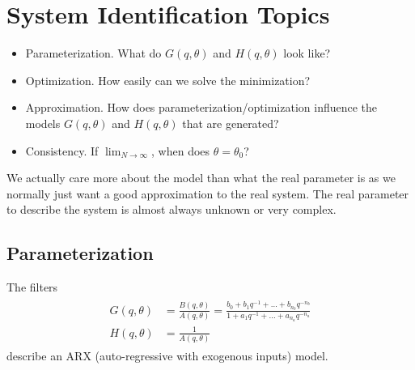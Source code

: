 \section{System Identification Topics}
\begin{itemize}
\item Parameterization. What do $G(q,\theta)$ and $H(q,\theta)$ look like?
\item Optimization. How easily can we solve the minimization?
\item Approximation. How does parameterization/optimization influence the models $G(q,\theta)$ and $H(q,\theta)$ that are generated?
\item Consistency. If $\lim_{N\to\infty}$, when does $\theta=\theta_0$?
\end{itemize}
We actually care more about the model than what the real parameter is as we normally just want a good approximation to the real system. The real parameter to describe the system is almost always unknown or very complex.

\subsection{Parameterization}
The filters
\begin{align}
\label{eq:arxmodel}
\begin{split}
G(q,\theta) &= \frac{B(q,\theta)}{A(q,\theta)} = \frac{b_0+b_1q^{-1}+\ldots+b_{n_b}q^{-n_b}}{1+a_1q^{-1}+\ldots+a_{n_a}q^{-n_a}} \\
H(q,\theta) &= \frac{1}{A(q,\theta)}
\end{split}
\end{align}
describe an ARX (auto-regressive with exogenous inputs) model.

